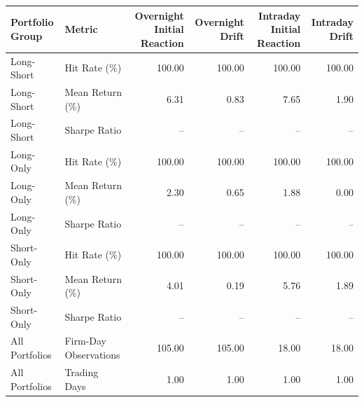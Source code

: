 \begin{tabular}{llrrrr}
\toprule
Portfolio Group & Metric & Overnight Initial Reaction & Overnight Drift & Intraday Initial Reaction & Intraday Drift \\
\midrule
Long-Short & Hit Rate (\%) & 100.00 & 100.00 & 100.00 & 100.00 \\
Long-Short & Mean Return (\%) & 6.31 & 0.83 & 7.65 & 1.90 \\
Long-Short & Sharpe Ratio & -- & -- & -- & -- \\
Long-Only & Hit Rate (\%) & 100.00 & 100.00 & 100.00 & 100.00 \\
Long-Only & Mean Return (\%) & 2.30 & 0.65 & 1.88 & 0.00 \\
Long-Only & Sharpe Ratio & -- & -- & -- & -- \\
Short-Only & Hit Rate (\%) & 100.00 & 100.00 & 100.00 & 100.00 \\
Short-Only & Mean Return (\%) & 4.01 & 0.19 & 5.76 & 1.89 \\
Short-Only & Sharpe Ratio & -- & -- & -- & -- \\
All Portfolios & Firm-Day Observations & 105.00 & 105.00 & 18.00 & 18.00 \\
All Portfolios & Trading Days & 1.00 & 1.00 & 1.00 & 1.00 \\
\bottomrule
\end{tabular}

